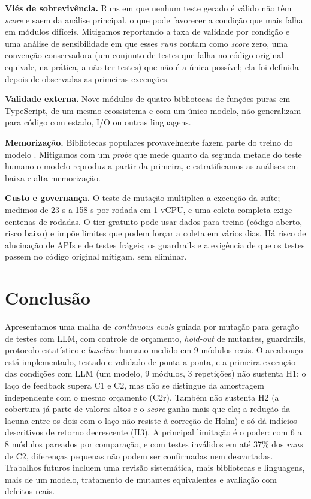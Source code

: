 \documentclass[12pt]{article}
\begin{document}
\textbf{Viés de sobrevivência.} Runs em que nenhum teste gerado é válido não têm \textit{score} e saem da análise principal,
o que pode favorecer a condição que mais falha em módulos difíceis. Mitigamos reportando a taxa de validade por condição e
uma análise de sensibilidade em que esses \textit{runs} contam como \textit{score} zero, uma convenção conservadora (um conjunto
de testes que falha no código original equivale, na prática, a não ter testes) que não é a única possível; ela foi definida
depois de observadas as primeiras execuções.

\textbf{Validade externa.} Nove módulos de quatro bibliotecas de funções puras em TypeScript, de um mesmo ecossistema e com
um único modelo, não generalizam para código com estado, I/O ou outras linguagens.

\textbf{Memorização.} Bibliotecas populares provavelmente fazem parte do treino do modelo \cite{carlini2021}. Mitigamos com um
\textit{probe} que mede quanto da segunda metade do teste humano o modelo reproduz a partir da primeira, e estratificamos as
análises em baixa e alta memorização.

\textbf{Custo e governança.} O teste de mutação multiplica a execução da suíte; medimos de 23 s a 158 s por rodada em
1 vCPU, e uma coleta completa exige centenas de rodadas. O tier gratuito pode usar dados para treino (código aberto, risco
baixo) e impõe limites que podem forçar a coleta em vários dias. Há risco de alucinação de APIs e de testes frágeis; os
guardrails e a exigência de que os testes passem no código original mitigam, sem eliminar.

\section{Conclusão}

Apresentamos uma malha de \textit{continuous evals} guiada por mutação para geração de testes com LLM, com controle de
orçamento, \textit{hold-out} de mutantes, guardrails, protocolo estatístico e \textit{baseline} humano medido em 9 módulos reais. O
arcabouço está implementado, testado e validado de ponta a ponta, e a primeira execução das condições com LLM (um modelo,
9 módulos, 3 repetições) não sustenta H1: o laço de feedback supera C1 e C2, mas não se distingue da amostragem independente
com o mesmo orçamento (C2r). Também não sustenta H2 (a cobertura já parte de valores altos e o \textit{score} ganha mais que ela; a redução da lacuna
entre os dois com o laço não resiste à correção de Holm) e só dá
indícios descritivos de retorno decrescente (H3). A principal limitação é o poder: com 6 a 8 módulos pareados por comparação,
e com testes inválidos em até 37\% dos \textit{runs} de C2, diferenças pequenas não podem ser confirmadas nem descartadas.
Trabalhos futuros incluem uma revisão sistemática, mais bibliotecas e linguagens,
mais de um modelo, tratamento de mutantes equivalentes e avaliação com defeitos reais.



\end{document}
